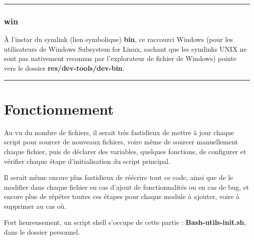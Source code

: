 \documentclass[a4paper,10pt]{article}
\begin{document}

\color{blue}\par\noindent\rule{\textwidth}{0.4pt}\color{white}

\color{blue}
\subsubsection{win}\color{white}

\begin{justify}
    À l'instar du symlink (lien symbolique) \textbf{\color{blue}bin}, ce raccourci Windows (pour les utilisateurs de Windows Subsystem for Linux, sachant que les symlinks UNIX ne sont pas nativement reconnus par l'explorateur de fichier de Windows) pointe vers le dossier \textbf{\color{lime}res/dev-tools/dev-bin}.
\end{justify}





\color{red}\par\noindent\rule{\textwidth}{0.4pt}\color{white}

\color{red}
\section{Fonctionnement}\color{white}

\begin{justify}
    Au vu du nombre de fichiers, il serait très fastidieux de mettre à jour chaque script pour sourcer de nouveaux fichiers, voire même de sourcer manuellement chaque fichier, puis de déclarer des variables, quelques fonctions, de configurer et vérifier chaque étape d'initialisation du script principal.
\end{justify}

\begin{justify}
    Il serait même encore plus fastidieux de réécrire tout ce code, ainsi que de le modifier dans chaque fichier en cas d'ajout de fonctionnalités ou en cas de bug, et encore plus de répéter toutes ces étapes pour chaque module à ajouter, voire à supprimer au cas où.
\end{justify}

\begin{justify}
    Fort heureusement, un script shell s'occupe de cette partie : \textbf{\color{lime}Bash-utils-init.sh}, dans le dossier personnel.
\end{justify}
\end{document}
